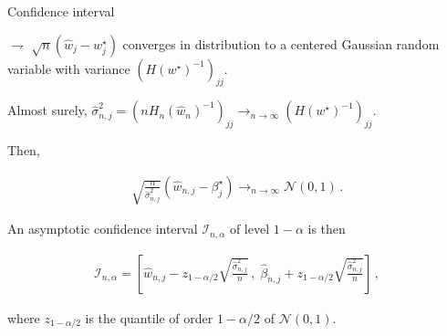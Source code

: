 \documentclass[xcolor={usenames,dvipsnames},handout]{beamer}
\begin{document}
\begin{frame}{Confidence interval}

$\rightharpoondown$ $\sqrt{n} ( \widehat{w}_j - w^{\star}_j) $ \alert{converges in distribution to a centered Gaussian random variable with variance $(H(w^{\star})^{-1})_{jj}$}.

\vspace{.3cm}

Almost surely, $\widehat{\sigma}_{n,j}^2 = (n H_n(\widehat{w}_n)^{-1})_{jj} \to_{n\to \infty} (H(w^{\star})^{-1})_{jj}$.

Then, 

\begin{align*}
\sqrt{\frac{n}{\widehat{\sigma}_{n,j}^2}} (\widehat{w}_{n,j} - \beta^{\star}_j ) \to_{n\to \infty} \mathcal{N}(0,1)\,.
\end{align*}

\vspace{.2cm}

An \alert{asymptotic confidence interval $\mathcal{I}_{n,\alpha}$ of level $1-\alpha$} is then 



\begin{align*}
\mathcal{I}_{n,\alpha} = \left[ \widehat{w}_{n,j} - z_{1-\alpha/2} \sqrt{\frac{\widehat{\sigma}^2_{n,j}}{n}}\,,\; \widehat{\beta}_{n,j} + z_{1-\alpha/2} \sqrt{\frac{\widehat{\sigma}^2_{n,j}}{n}}  \right]\,,
\end{align*}

\vspace{.2cm}
where $z_{1- \alpha/2}$ is the quantile of order $1- \alpha/2$ of $\mathcal{N}(0, 1)$.
\end{frame}
\end{document}
